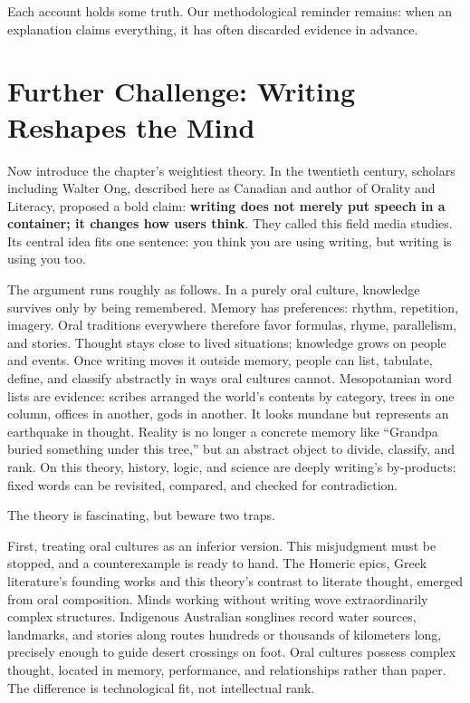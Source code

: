Each account holds some truth. Our methodological reminder remains: when an explanation claims everything, it has often discarded evidence in advance.

\section[Writing Reshapes the Mind]{Further Challenge: Writing Reshapes the Mind}
Now introduce the chapter's weightiest theory. In the twentieth century, scholars including Walter Ong, described here as Canadian and author of Orality and Literacy, proposed a bold claim: \textbf{writing does not merely put speech in a container; it changes how users think}. They called this field media studies. Its central idea fits one sentence: you think you are using writing, but writing is using you too.

The argument runs roughly as follows. In a purely oral culture, knowledge survives only by being remembered. Memory has preferences: rhythm, repetition, imagery. Oral traditions everywhere therefore favor formulas, rhyme, parallelism, and stories. Thought stays close to lived situations; knowledge grows on people and events. Once writing moves it outside memory, people can list, tabulate, define, and classify abstractly in ways oral cultures cannot. Mesopotamian word lists are evidence: scribes arranged the world's contents by category, trees in one column, offices in another, gods in another. It looks mundane but represents an earthquake in thought. Reality is no longer a concrete memory like ``Grandpa buried something under this tree,'' but an abstract object to divide, classify, and rank. On this theory, history, logic, and science are deeply writing's by-products: fixed words can be revisited, compared, and checked for contradiction.

The theory is fascinating, but beware two traps.

First, treating oral cultures as an inferior version. This misjudgment must be stopped, and a counterexample is ready to hand. The Homeric epics, Greek literature's founding works and this theory's contrast to literate thought, emerged from oral composition. Minds working without writing wove extraordinarily complex structures. Indigenous Australian songlines record water sources, landmarks, and stories along routes hundreds or thousands of kilometers long, precisely enough to guide desert crossings on foot. Oral cultures possess complex thought, located in memory, performance, and relationships rather than paper. The difference is technological fit, not intellectual rank.

